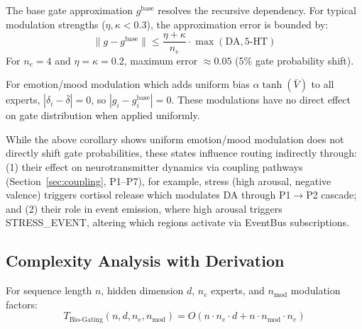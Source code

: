 \documentclass[preprint,12pt]{elsarticle}
\begin{document}
\begin{remark}
The base gate approximation $g^{\text{base}}$ resolves the recursive dependency. For typical modulation strengths ($\eta, \kappa < 0.3$), the approximation error is bounded by:
\begin{equation}
\|g - g^{\text{base}}\| \leq \frac{\eta + \kappa}{n_e} \cdot \max(\text{DA}, \text{5-HT})
\end{equation}
For $n_e = 4$ and $\eta = \kappa = 0.2$, maximum error $\approx 0.05$ (5\% gate probability shift).
\end{remark}

\begin{corollary}
For emotion/mood modulation which adds uniform bias $\alpha \tanh(\bar{V})$ to all experts, $|\delta_i - \bar{\delta}| = 0$, so $|g_i - g_i^{\text{base}}| = 0$. These modulations have no direct effect on gate distribution when applied uniformly.
\end{corollary}

\begin{remark}
While the above corollary shows uniform emotion/mood modulation does not directly shift gate probabilities, these states influence routing indirectly through: (1) their effect on neurotransmitter dynamics via coupling pathways (Section~\ref{sec:coupling}, P1--P7), for example, stress (high arousal, negative valence) triggers cortisol release which modulates DA through P1$\rightarrow$P2 cascade; and (2) their role in event emission, where high arousal triggers STRESS\_EVENT, altering which regions activate via EventBus subscriptions.
\end{remark}

\subsection{Complexity Analysis with Derivation}

\begin{theorem}
For sequence length $n$, hidden dimension $d$, $n_e$ experts, and $n_{\text{mod}}$ modulation factors:
\begin{equation}
T_{\text{Bio-Gating}}(n, d, n_e, n_{\text{mod}}) = O(n \cdot n_e \cdot d + n \cdot n_{\text{mod}} \cdot n_e)
\end{equation}
\end{theorem}
\end{document}
